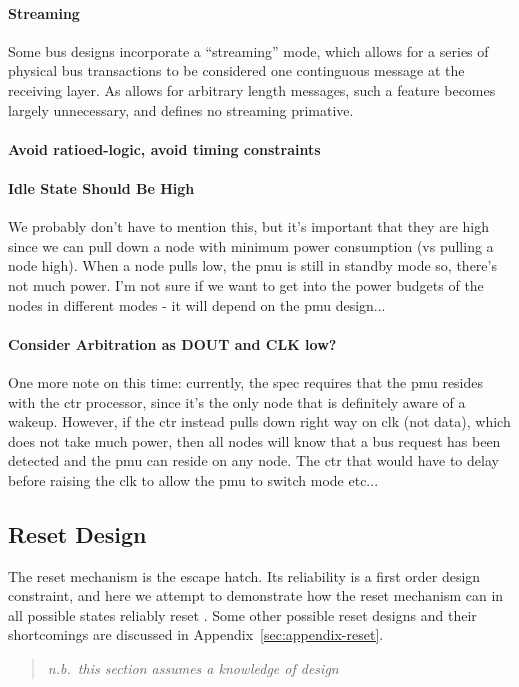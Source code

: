 \paragraph{Streaming}
Some bus designs incorporate a ``streaming'' mode, which allows for a series
of physical bus transactions to be considered one continguous message at the
receiving layer. As \bus allows for arbitrary length messages, such a feature
becomes largely unnecessary, and \bus defines no streaming primative.

\paragraph{Avoid ratioed-logic, avoid timing constraints}

\paragraph{Idle State Should Be High}
We probably don't have to mention this, but it's important that they are high
since we can pull down a node with minimum power consumption (vs pulling a
node high). When a node pulls low, the pmu is still in standby mode so,
there's not much power.  I'm not sure if we want to get into the power budgets
of the nodes in different modes - it will depend on the pmu design...

\paragraph{Consider Arbitration as DOUT and CLK low?}
One more note on this time:  currently, the spec requires that the pmu resides
with the ctr processor, since it's the only node that is definitely aware of a
wakeup.  However, if the ctr instead pulls down right way on clk (not data),
which does not take much power, then all nodes will know that a bus request
has been detected and the pmu can reside on any node.  The ctr that would have
to delay before raising the clk to allow the pmu to switch mode etc...

\subsection{Reset Design}
\label{sec:design-reset}
The reset mechanism is the \bus escape hatch. Its reliability is a first
order design constraint, and here we attempt to demonstrate how the reset
mechanism can in all possible states reliably reset \bus. Some other possible
reset designs and their shortcomings are discussed in
Appendix~\ref{sec:appendix-reset}.
\begin{quote}
\em n.b.\ this section assumes a knowledge of \bus design
\end{quote}

